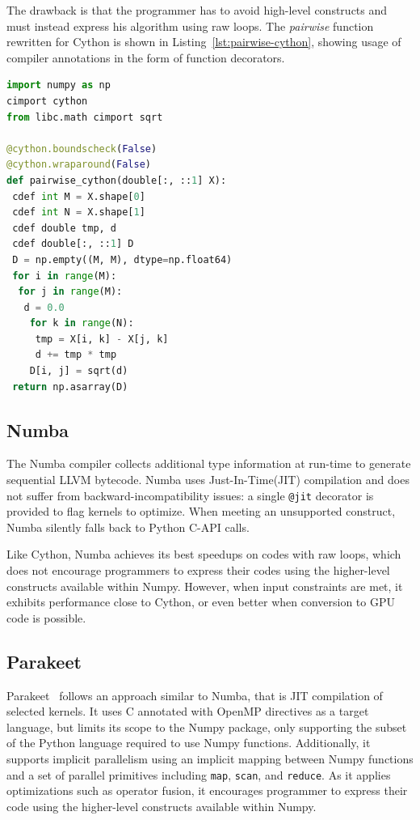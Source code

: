 \documentclass[10pt, preprint]{sigplanconf}
\begin{document}
The drawback is that the programmer has to avoid high-level constructs and
must instead express his algorithm using raw loops.  The \textit{pairwise}
function rewritten for Cython is shown in Listing~\ref{lst:pairwise-cython},
showing usage of compiler annotations in the form of function decorators.

\begin{lstlisting}[language=python, caption={\textit{pairwise} function
  rewritten for Cython.}, label={lst:pairwise-cython}]
%%cython
import numpy as np
cimport cython
from libc.math cimport sqrt

@cython.boundscheck(False)
@cython.wraparound(False)
def pairwise_cython(double[:, ::1] X):
 cdef int M = X.shape[0]
 cdef int N = X.shape[1]
 cdef double tmp, d
 cdef double[:, ::1] D
 D = np.empty((M, M), dtype=np.float64)
 for i in range(M):
  for j in range(M):
   d = 0.0
    for k in range(N):
     tmp = X[i, k] - X[j, k]
     d += tmp * tmp
    D[i, j] = sqrt(d)
 return np.asarray(D)
\end{lstlisting}

\subsection{Numba}


The Numba compiler collects additional type information at run-time to
generate sequential LLVM bytecode.  Numba uses Just-In-Time(JIT) compilation
and does not suffer from backward-incompatibility issues: a single
\texttt{@jit} decorator is provided to flag kernels to optimize. When meeting an
unsupported construct, Numba silently falls back to Python C-API calls.

Like Cython, Numba achieves its best speedups on codes with raw loops, which
does not encourage programmers to express their codes using the higher-level
constructs available within Numpy. However, when input constraints are met, it
exhibits performance close to Cython, or even better when conversion to GPU
code is possible.

\subsection{Parakeet}

Parakeet~\cite{parakeet2012} follows an approach similar to Numba, that is JIT
compilation of selected kernels. It uses C annotated with OpenMP directives as
a target language, but limits its scope to the Numpy package, only supporting
the subset of the Python language required to use Numpy functions.
Additionally, it supports implicit parallelism using an implicit mapping
between Numpy functions and a set of parallel primitives including
\texttt{map}, \texttt{scan}, and \texttt{reduce}.  As it applies optimizations
such as operator fusion, it encourages programmer to express their code using
the higher-level constructs available within Numpy.
\end{document}

